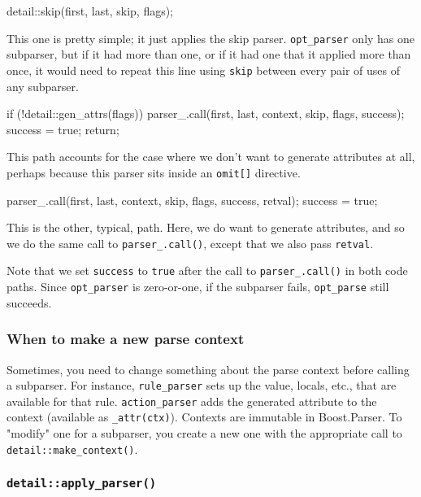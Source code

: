 \begin{code}
detail::skip(first, last, skip, flags);
\end{code}

This one is pretty simple; it just applies the skip parser. \texttt{opt\_parser} only has one subparser, but if it had more than one, or if it had one that it applied more than once, it would need to repeat this line using \texttt{skip} between every pair of uses of any subparser.

\begin{code}
if (!detail::gen_attrs(flags)) {
    parser_.call(first, last, context, skip, flags, success);
    success = true;
    return;
}
\end{code}

This path accounts for the case where we don't want to generate attributes at all, perhaps because this parser sits inside an \texttt{omit{[}{]}} directive.

\begin{code}
parser_.call(first, last, context, skip, flags, success, retval);
success = true;
\end{code}

This is the other, typical, path. Here, we do want to generate attributes, and so we do the same call to \texttt{parser\_.call()}, except that we also pass \texttt{retval}.

Note that we set \texttt{success} to \texttt{true} after the call to \texttt{parser\_.call()} in both code paths. Since \texttt{opt\_parser} is zero-or-one, if the subparser fails, \texttt{opt\_parse} still succeeds.

\subsubsection{When to make a new parse context}

Sometimes, you need to change something about the parse context before calling a subparser. For instance, \texttt{rule\_parser} sets up the value, locals, etc., that are available for that rule. \texttt{action\_parser} adds the generated attribute to the context (available as \texttt{\_attr(ctx)}). Contexts are immutable in Boost.Parser. To "modify" one for a subparser, you create a new one with the appropriate call to \texttt{detail::make\_context()}.

\subsubsection{\texorpdfstring{\texttt{detail::apply\_parser()}}{detail::apply\_parser()}}


